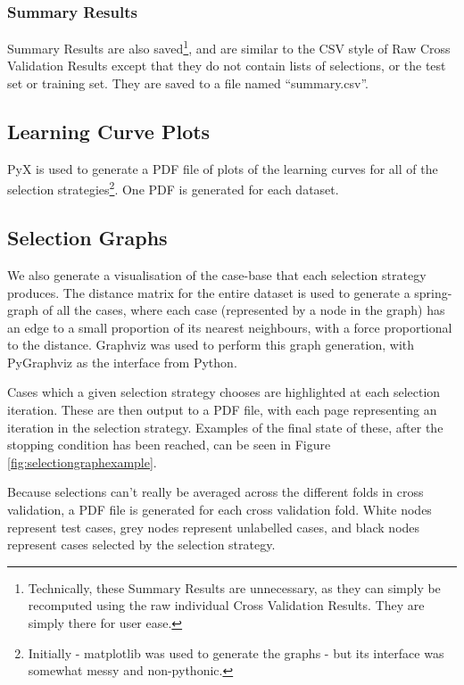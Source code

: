 \documentclass[a4paper,11pt]{report}
\begin{document}
\subsubsection{Summary Results}
Summary Results are also saved\footnote{Technically, these Summary Results are unnecessary, as they can simply be recomputed using the raw individual Cross Validation Results. They are simply there for user ease.}, and are similar to the CSV style of Raw Cross Validation Results except that they do not contain lists of selections, or the test set or training set. They are saved to a file named ``summary.csv''.

\subsection{Learning Curve Plots}
PyX \citep{prog:pyx} is used to generate a PDF file of plots of the learning curves for all of the selection strategies\footnote{Initially - matplotlib \citep{prog:matplotlib} was used to generate the graphs - but its interface was somewhat messy and non-pythonic.}. One PDF is generated for each dataset.

\subsection{Selection Graphs\label{sec:selectiongraphs}}
We also generate a visualisation of the case-base that each selection strategy produces. The distance matrix for the entire dataset is used to generate a spring-graph of all the cases, where each case (represented by a node in the graph) has an edge to a small proportion of its nearest neighbours, with a force proportional to the distance. Graphviz \citep{prog:graphviz} was used to perform this graph generation, with PyGraphviz \citep{prog:pygraphviz} as the interface from Python.

Cases which a given selection strategy chooses are highlighted at each selection iteration. These are then output to a PDF file, with each page representing an iteration in the selection strategy. Examples of the final state of these, after the stopping condition has been reached, can be seen in Figure \ref{fig:selectiongraphexample}.

Because selections can't really be averaged across the different folds in cross validation, a PDF file is generated for each cross validation fold. White nodes represent test cases, grey nodes represent unlabelled cases, and black nodes represent cases selected by the selection strategy.
\end{document}
